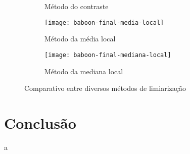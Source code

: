 \documentclass[brazilian,a4paper,twocolumn]{article}
\begin{document}
\begin{figure}
\begin{subfigure}{0.23\textwidth}
                \caption{Método do contraste}
                \label{fig:baboon-contraste}
            \end{subfigure}
            \begin{subfigure}{0.23\textwidth}
                \texttt{[image: baboon-final-media-local]}
                \caption{Método da média local}
                \label{fig:baboon-media}
            \end{subfigure}
            \begin{subfigure}{0.23\textwidth}
                \texttt{[image: baboon-final-mediana-local]}
                \caption{Método da mediana local}
                \label{fig:baboon-mediana}
            \end{subfigure}

            \caption{Comparativo entre diversos métodos de limiarização}
            \label{fig:baboon-limiarizacao}
        \end{figure}

\section{Conclusão}

    a
\end{document}
